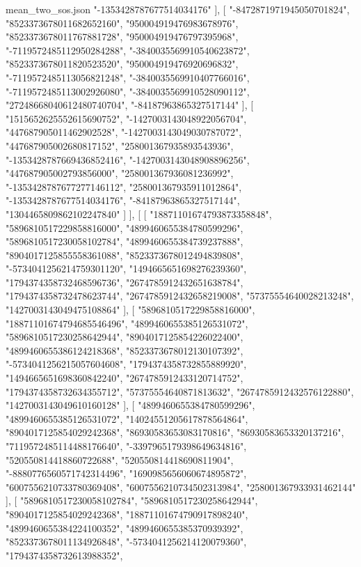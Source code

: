 \begin{filecontents*}[overwrite]{mean_two_sos.json}
    "-1353428787677514034176"
   ],
   [
    "-8472871971945050701824",
    "8523373678011682652160",
    "950004919476983678976",
    "8523373678011767881728",
    "950004919476797395968",
    "-7119572485112950284288",
    "-3840035569910540623872",
    "8523373678011820523520",
    "950004919476920696832",
    "-7119572485113056821248",
    "-3840035569910407766016",
    "-7119572485113002926080",
    "-3840035569910528090112",
    "27248668040612480740704",
    "-84187963865327517144"
   ],
   [
    "1515652625552615690752",
    "-1427003143048922056704",
    "447687905011462902528",
    "-1427003143049030787072",
    "447687905002680817152",
    "258001367935893543936",
    "-1353428787669436852416",
    "-1427003143048908896256",
    "447687905002793856000",
    "258001367936081236992",
    "-1353428787677277146112",
    "258001367935911012864",
    "-1353428787677514034176",
    "-84187963865327517144",
    "1304465809862102247840"
   ]
  ],
  [
   [
    "18871101674793873358848",
    "5896810517229858816000",
    "4899460655384780599296",
    "5896810517230058102784",
    "4899460655384739237888",
    "8904017125855558361088",
    "8523373678012494839808",
    "-5734041256214759301120",
    "1494665651698276239360",
    "1794374358732468596736",
    "2674785912432651638784",
    "1794374358732478623744",
    "2674785912432658219008",
    "57375554640028213248",
    "1427003143049475108864"
   ],
   [
    "5896810517229858816000",
    "18871101674794685546496",
    "4899460655385126531072",
    "5896810517230258642944",
    "8904017125854226022400",
    "4899460655386124218368",
    "8523373678012130107392",
    "-5734041256215057604608",
    "1794374358732855889920",
    "1494665651698360842240",
    "2674785912433120714752",
    "1794374358732634355712",
    "57375554640871813632",
    "2674785912432576122880",
    "1427003143049610160128"
   ],
   [
    "4899460655384780599296",
    "4899460655385126531072",
    "14024551205617878564864",
    "8904017125854029242368",
    "86930583653083170816",
    "86930583653320137216",
    "7119572485114488176640",
    "-3397965179398649634816",
    "520550814418860722688",
    "520550814418690811904",
    "-8880776560571742314496",
    "1690985656060674895872",
    "6007556210733780369408",
    "6007556210734502313984",
    "258001367933931462144"
   ],
   [
    "5896810517230058102784",
    "5896810517230258642944",
    "8904017125854029242368",
    "18871101674790917898240",
    "4899460655384224100352",
    "4899460655385370939392",
    "8523373678011134926848",
    "-5734041256214120079360",
    "1794374358732613988352",

\end{filecontents*}
